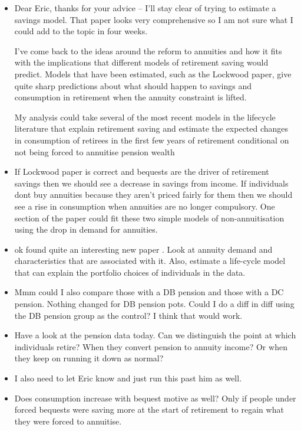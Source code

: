 \documentclass[12pt]{article}
\begin{document}
\begin{itemize}
      \item Dear Eric, thanks for your advice -- I'll stay clear of trying to
            estimate a savings model. That paper looks very comprehensive so I
            am not sure what I could add to the topic in four weeks.

            I've come back to the ideas around the reform to annuities and how
            it fits with the implications that different models of retirement
            saving would predict. Models that have been estimated, such as the
            Lockwood paper, give quite sharp predictions about what should
            happen to savings and consumption in retirement when the annuity
            constraint is lifted.

            My analysis could take several of the most recent models in the
            lifecycle literature that explain retirement saving and estimate the
            expected changes in consumption of retirees in the first few years
            of retirement conditional on not being forced to annuitise pension
            wealth

      \item If Lockwood paper is correct and bequests are the driver of
            retirement savings then we should see a decrease in savings from
            income. If individuals dont buy annuities because they aren't priced
            fairly for them then we should see a rise in consumption when
            annuities are no longer compulsory. One section of the paper could
            fit these two simple models of non-annuitisation using the drop in
            demand for annuities.


      \item ok found quite an interesting new paper
            \cite{inkman_et_al_rfs_2011}. Look at annuity demand and
            characteristics that are associated with it. Also, estimate a
            life-cycle model that can explain the portfolio choices of
            individuals in the data.

      \item Mmm could I also compare those with a DB pension and those with a DC
            pension. Nothing changed for DB pension pots. Could I do a diff in
            diff using the DB pension group as the control? I think that would
            work.

      \item Have a look at the pension data today. Can we distinguish the point
            at which individuals retire? When they convert pension to annuity
            income? Or when they keep on running it down as normal?

      \item I also need to let Eric know and just run this past him as well.


      \item Does consumption increase with bequest motive as well? Only if
            people under forced bequests were saving more at the start of
            retirement to regain what they were forced to annuitise.


\end{itemize}
\end{document}
